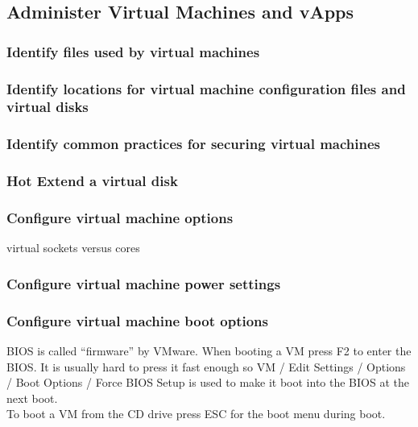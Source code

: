 \subsection{Administer Virtual Machines and vApps}

\subsubsection{Identify files used by virtual machines}

\subsubsection{Identify locations for virtual machine configuration files and virtual disks}

\subsubsection{Identify common practices for securing virtual machines}

\subsubsection{Hot Extend a virtual disk}

\subsubsection{Configure virtual machine options}

virtual sockets versus cores

\subsubsection{Configure virtual machine power settings}

\subsubsection{Configure virtual machine boot options}

BIOS is called ``firmware'' by VMware. When booting a VM press F2 to enter
the BIOS. It is usually hard to press it fast enough so VM / Edit Settings /
Options / Boot Options / Force BIOS Setup is used to make it boot into the
BIOS at the next boot.\\

To boot a VM from the CD drive press ESC for the boot menu during boot.\\

